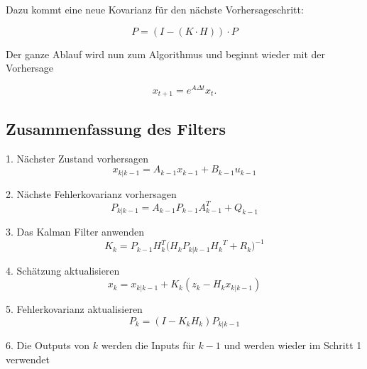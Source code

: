 Dazu kommt  eine neue Kovarianz für den nächste Vorhersageschritt:

\begin{equation}
P=(I-(K \cdot H)) \cdot P  
\end{equation}

Der ganze Ablauf wird nun zum Algorithmus und beginnt wieder mit der Vorhersage 

\begin{equation}
{x_{t+1}}=e^{A\Delta t}{ x_t}.
\end{equation} 


\subsection{Zusammenfassung des Filters}


1. Nächster Zustand vorhersagen
\begin{equation}
{x_{k|k-1}}={A_{k-1}}{x_{k-1}}+{B_{k-1}}{u_{k-1}}
\end{equation} 

2. Nächste Fehlerkovarianz vorhersagen
\begin{equation}
{P_{k|k-1}}={A_{k-1}}{P_{k-1}}{A_{k-1}^T}+{Q_{k-1}}
\end{equation} 


3. Das Kalman Filter anwenden
\begin{equation}
{K_k}={P_{k-1}}{H_{k}^T({H_k}{P_{k|k-1}}{H_k}^T}+{R_k})^{-1}
\end{equation}

4. Schätzung aktualisieren
\begin{equation}
{x_k}={x_{k|k-1}}+{K_k}({z_k}-{H_k}{x_{k|k-1}})
\end{equation}  

5. Fehlerkovarianz aktualisieren
\begin{equation}
{P_k}=(I-{K_k}{H_k}){P_{k|k-1}}
\end{equation}  

6. Die Outputs von $k$ werden die Inputs für ${k-1}$ und werden wieder im Schritt 1 verwendet


